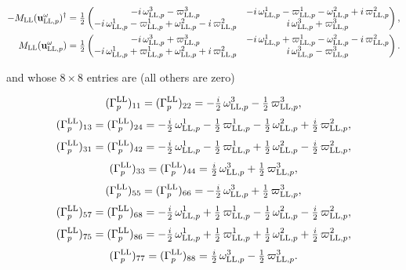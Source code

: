 \documentclass[
  10pt,
]{article}
\begin{document}
\[\begin{aligned}-M_{\rm LL}(\mathbf u^{\omega}_{{\rm LL},p})^\dagger&=\tfrac12\begin{pmatrix}-i\,\omega^{3}_{{\rm LL},p}-\varpi^{3}_{{\rm LL},p}&-i\,\omega^{1}_{{\rm LL},p}-\varpi^{1}_{{\rm LL},p}-\omega^{2}_{{\rm LL},p}+i\,\varpi^{2}_{{\rm LL},p}\\-i\,\omega^{1}_{{\rm LL},p}-\varpi^{1}_{{\rm LL},p}+\omega^{2}_{{\rm LL},p}-i\,\varpi^{2}_{{\rm LL},p}&i\,\omega^{3}_{{\rm LL},p}+\varpi^{3}_{{\rm LL},p}\end{pmatrix},\\ M_{\rm LL}(\mathbf u^{\omega}_{{\rm LL},p})&=\tfrac12\begin{pmatrix}-i\,\omega^{3}_{{\rm LL},p}+\varpi^{3}_{{\rm LL},p}&-i\,\omega^{1}_{{\rm LL},p}+\varpi^{1}_{{\rm LL},p}-\omega^{2}_{{\rm LL},p}-i\,\varpi^{2}_{{\rm LL},p}\\-i\,\omega^{1}_{{\rm LL},p}+\varpi^{1}_{{\rm LL},p}+\omega^{2}_{{\rm LL},p}+i\,\varpi^{2}_{{\rm LL},p}&i\,\omega^{3}_{{\rm LL},p}-\varpi^{3}_{{\rm LL},p}\end{pmatrix}.\end{aligned}\]

and whose \(8\times8\) entries are (all others are zero)

\[(\Gamma^{\rm LL}_p)_{11}=(\Gamma^{\rm LL}_p)_{22}=-\tfrac{i}{2}\,\omega^{3}_{{\rm LL},p}-\tfrac{1}{2}\,\varpi^{3}_{{\rm LL},p},\]
\[(\Gamma^{\rm LL}_p)_{13}=(\Gamma^{\rm LL}_p)_{24}=-\tfrac{i}{2}\,\omega^{1}_{{\rm LL},p}-\tfrac{1}{2}\,\varpi^{1}_{{\rm LL},p}-\tfrac{1}{2}\,\omega^{2}_{{\rm LL},p}+\tfrac{i}{2}\,\varpi^{2}_{{\rm LL},p},\]
\[(\Gamma^{\rm LL}_p)_{31}=(\Gamma^{\rm LL}_p)_{42}=-\tfrac{i}{2}\,\omega^{1}_{{\rm LL},p}-\tfrac{1}{2}\,\varpi^{1}_{{\rm LL},p}+\tfrac{1}{2}\,\omega^{2}_{{\rm LL},p}-\tfrac{i}{2}\,\varpi^{2}_{{\rm LL},p},\]
\[(\Gamma^{\rm LL}_p)_{33}=(\Gamma^{\rm LL}_p)_{44}=\tfrac{i}{2}\,\omega^{3}_{{\rm LL},p}+\tfrac{1}{2}\,\varpi^{3}_{{\rm LL},p},\]
\[(\Gamma^{\rm LL}_p)_{55}=(\Gamma^{\rm LL}_p)_{66}=-\tfrac{i}{2}\,\omega^{3}_{{\rm LL},p}+\tfrac{1}{2}\,\varpi^{3}_{{\rm LL},p},\]
\[(\Gamma^{\rm LL}_p)_{57}=(\Gamma^{\rm LL}_p)_{68}=-\tfrac{i}{2}\,\omega^{1}_{{\rm LL},p}+\tfrac{1}{2}\,\varpi^{1}_{{\rm LL},p}-\tfrac{1}{2}\,\omega^{2}_{{\rm LL},p}-\tfrac{i}{2}\,\varpi^{2}_{{\rm LL},p},\]
\[(\Gamma^{\rm LL}_p)_{75}=(\Gamma^{\rm LL}_p)_{86}=-\tfrac{i}{2}\,\omega^{1}_{{\rm LL},p}+\tfrac{1}{2}\,\varpi^{1}_{{\rm LL},p}+\tfrac{1}{2}\,\omega^{2}_{{\rm LL},p}+\tfrac{i}{2}\,\varpi^{2}_{{\rm LL},p},\]
\[(\Gamma^{\rm LL}_p)_{77}=(\Gamma^{\rm LL}_p)_{88}=\tfrac{i}{2}\,\omega^{3}_{{\rm LL},p}-\tfrac{1}{2}\,\varpi^{3}_{{\rm LL},p}.\]
\end{document}
